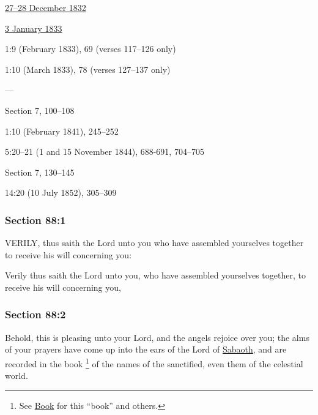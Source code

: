 		\begin{compactdesc}
			\item[JSP] \phantom{.}
				\begin{compactdesc}
					\item[Verses 1--126] \hyperref[EMS-1832-JS-27-28-DEC-1832]{27--28 December 1832}
					\item[Verses 127--137] \hyperref[EMS-1833-JS-3-JAN-1833]{3 January 1833}
				\end{compactdesc}
			\item[EMS] 1:9 (February 1833), 69 (verses 117--126 only)
			\item[EMS] 1:10 (March 1833), 78 (verses 127--137 only)
			\item[BC] ---
			\item[DC 1835] Section 7, 100--108
			\item[MS] 1:10 (February 1841), 245--252
			\item[TS] 5:20--21 (1 and 15 November 1844), 688-691, 704--705
			\item[DC 1844] Section 7, 130--145
			\item[MS] 14:20 (10 July 1852), 305--309
		\end{compactdesc}

	\subsubsection{Section 88:1} %
		\label{DC88-1}

		VERILY, thus saith the Lord unto you who have assembled yourselves together to receive his will concerning you:

		\begin{framed}
		\scriptsize
			\begin{compactdesc}
				\item[JSP] Verily thus saith the Lord unto you, who have assembled yourselves together, to receive his will concerning you,
			\end{compactdesc}
		\end{framed}

	\subsubsection{Section 88:2} %
		\label{DC88-2}

		Behold, this is pleasing unto your Lord, and the angels rejoice over you; the alms of your prayers have come up into the ears of the Lord of \hyperref[SABAOTH]{Sabaoth}, and are recorded in the book%
			\footnote{%
				See \hyperref[BOOK]{Book} for this ``book'' and others.
				}
		of the names of the sanctified, even them of the celestial world.

